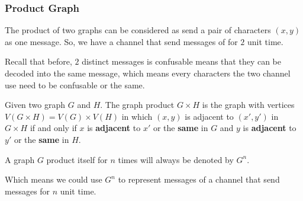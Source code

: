 \begin{frame}
      \frametitle{Product Graph}
      
      The product of two graphs can be considered as send a pair of characters $(x,y)$ as one message. So, we have a channel that send messages of for $2$ unit time.

      \pause
      \smallskip

      Recall that before, $2$ distinct messages is confusable means that they can be decoded into the same message, which means every characters the two channel use need to be confusable or the same.

      \begin{definition}\label{def:graphProduct}
            Given two graph $ G $ and $ H $. The graph product $ G \times H $ is the graph with vertices $ V(G \times H) = V(G) \times V(H) $ in which $ (x,y) $ is adjacent to $ (x',y') $ in $ G \times H $ if and only if $ x $ is \textbf{adjacent} to $ x' $ or the \textbf{same} in $ G $ and $ y $ is \textbf{adjacent} to $ y' $ or the \textbf{same} in $ H $.

            \pause

            A graph $ G $ product itself for $ n $ times will always be denoted by $ G^n $.

            Which means we could use $ G^n $ to represent messages of a channel that send messages for $n$ unit time.
      \end{definition}
\end{frame}

